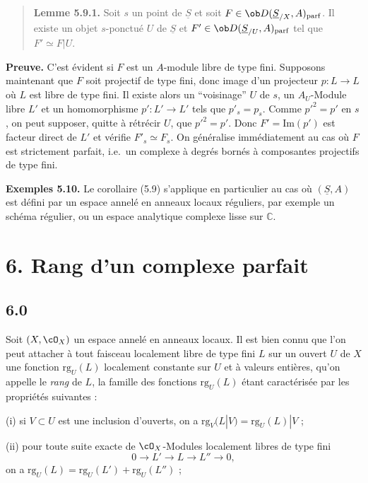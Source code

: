 \begin{quote}
\textbf{Lemme 5.9.1.} Soit $s$ un point de $\underline{S}$ et soit $F \in \ob D(\underline{S}_{/X}, A)_{\mathrm{parf}}$. Il existe un objet $s$-ponctué $U$ de $\underline{S}$ et $F' \in \ob D(\underline{S}_{/U}, A)_{\mathrm{parf}}$ tel que $F' \simeq F|U$.
\end{quote}

\textbf{Preuve.} C'est évident si $F$ est un $A$-module libre de type fini. Supposons maintenant que $F$ soit projectif de type fini, donc image d'un projecteur $p : L \to L$ où $L$ est libre de type fini. Il existe alors un ``voisinage'' $U$ de $s$, un $A_U$-Module libre $L'$ et un homomorphisme $p' : L' \to L'$ tels que $p'_s = p_s$. Comme $p'^2 = p'$ en $s$, on peut supposer, quitte à rétrécir $U$, que $p'^2 = p'$. Donc $F' = \mathrm{Im}(p')$ est facteur direct de $L'$ et vérifie $F'_s \simeq F_s$. On généralise immédiatement au cas où $F$ est strictement parfait, i.e.\ un complexe à degrés bornés à composantes projectifs de type fini.

\textbf{Exemples 5.10.} Le corollaire (5.9) s'applique en particulier au cas où $(\underline{S}, A)$ est défini par un espace annelé en anneaux locaux réguliers, par exemple un schéma régulier, ou un espace analytique complexe lisse sur $\mathbb{C}$.

\section*{6. Rang d'un complexe parfait}

\subsection*{6.0}

Soit $(X, \cO_X)$ un espace annelé en anneaux locaux. Il est bien connu que l'on peut attacher à tout faisceau localement libre de type fini $L$ sur un ouvert $U$ de $X$ une fonction $\mathrm{rg}_U(L)$ localement constante sur $U$ et à valeurs entières, qu'on appelle le \emph{rang} de $L$, la famille des fonctions $\mathrm{rg}_U(L)$ étant caractérisée par les propriétés suivantes :

(i) si $V \subset U$ est une inclusion d'ouverts, on a $\mathrm{rg}_V(L|V) = \mathrm{rg}_U(L)|V$ ;

(ii) pour toute suite exacte de $\cO_X$-Modules localement libres de type fini
\[
0 \longrightarrow L' \longrightarrow L \longrightarrow L'' \longrightarrow 0,
\]
on a $\mathrm{rg}_U(L) = \mathrm{rg}_U(L') + \mathrm{rg}_U(L'')$ ;

